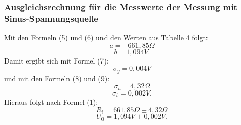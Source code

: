 \subsubsection{Ausgleichsrechnung für die Messwerte der Messung mit Sinus-Spannungsquelle}
Mit den Formeln (5) und (6) und den Werten aus Tabelle 4 folgt:
\begin{displaymath}
a=-661,85\Omega
\end{displaymath}
\begin{displaymath}
b=1,094V\text{.}
\end{displaymath}
Damit ergibt sich mit Formel (7):
\begin{displaymath}
\sigma_y=0,004V
\end{displaymath}
und mit den Formeln (8) und (9):
\begin{displaymath}
\sigma_a=4,32\Omega
\end{displaymath}
\begin{displaymath}
\sigma_b=0,002V\text{.}
\end{displaymath}
Hieraus folgt nach Formel (1):
\begin{displaymath}
R_i=661,85\Omega\pm 4,32\Omega
\end{displaymath}
\begin{displaymath}
U_0=1,094V\pm 0,002V\text{.}
\end{displaymath}
























































\newpage
